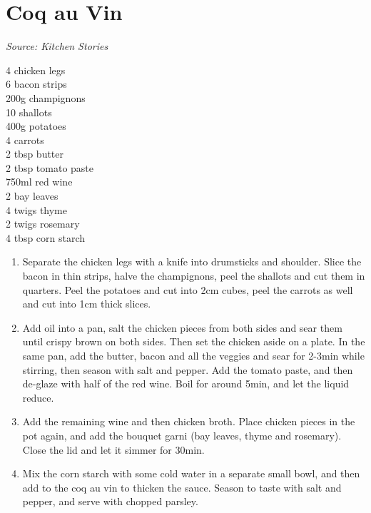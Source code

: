 \documentclass{report}
\begin{document}
\section{Coq au Vin}
\textit{Source: Kitchen Stories}\\
\begin{minipage}[t]{0.21\textwidth} \vspace{0pt}
4 chicken legs\\
6 bacon strips\\
200g champignons\\
10 shallots\\
400g potatoes\\
4 carrots\\
2 tbsp butter\\
2 tbsp tomato paste\\
750ml red wine\\
2 bay leaves\\
4 twigs thyme\\
2 twigs rosemary\\
4 tbsp corn starch
\end{minipage}
\hfill
\begin{minipage}[t]{0.78\textwidth} \vspace{0pt}
	\begin{enumerate}
		\item Separate the chicken legs with a knife into drumsticks and shoulder. Slice the bacon in thin strips, halve the champignons, peel the shallots and cut them in quarters. Peel the potatoes and cut into 2cm cubes, peel the carrots as well and cut into 1cm thick slices.
		\item Add oil into a pan, salt the chicken pieces from both sides and sear them until crispy brown on both sides. Then set the chicken aside on a plate. In the same pan, add the butter, bacon and all the veggies and sear for 2-3min while stirring, then season with salt and pepper. Add the tomato paste, and then de-glaze with half of the red wine. Boil for around 5min, and let the liquid reduce.
		\item Add the remaining wine and then chicken broth. Place chicken pieces in the pot again, and add the bouquet garni (bay leaves, thyme and rosemary). Close the lid and let it simmer for 30min.
		\item Mix the corn starch with some cold water in a separate small bowl, and then add to the coq au vin to thicken the sauce. Season to taste with salt and pepper, and serve with chopped parsley.
	\end{enumerate}	
\end{minipage}
\end{document}
